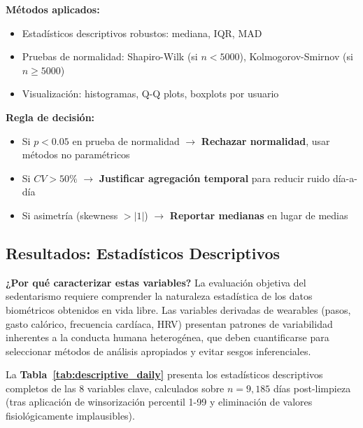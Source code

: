 \documentclass[12pt,letterpaper,twoside]{report}
\begin{document}
\begin{estadisticobox}
\textbf{Métodos aplicados:}

\begin{itemize}[noitemsep]
    \item Estadísticos descriptivos robustos: mediana, IQR, MAD
    \item Pruebas de normalidad: Shapiro-Wilk (si $n<5000$), Kolmogorov-Smirnov (si $n \geq 5000$)
    \item Visualización: histogramas, Q-Q plots, boxplots por usuario
\end{itemize}
\end{estadisticobox}

\begin{reglabox}
\textbf{Regla de decisión:}

\begin{itemize}[noitemsep]
    \item Si $p < 0.05$ en prueba de normalidad $\to$ \textbf{Rechazar normalidad}, usar métodos no paramétricos
    \item Si $CV > 50\%$ $\to$ \textbf{Justificar agregación temporal} para reducir ruido día-a-día
    \item Si asimetría (skewness $> |1|$) $\to$ \textbf{Reportar medianas} en lugar de medias
\end{itemize}
\end{reglabox}

\subsection{Resultados: Estadísticos Descriptivos}

\textbf{¿Por qué caracterizar estas variables?} La evaluación objetiva del sedentarismo requiere comprender la naturaleza estadística de los datos biométricos obtenidos en vida libre. Las variables derivadas de wearables (pasos, gasto calórico, frecuencia cardíaca, HRV) presentan patrones de variabilidad inherentes a la conducta humana heterogénea, que deben cuantificarse para seleccionar métodos de análisis apropiados y evitar sesgos inferenciales.

La \textbf{Tabla~\ref{tab:descriptive_daily}} presenta los estadísticos descriptivos completos de las 8 variables clave, calculados sobre $n=9,185$ días post-limpieza (tras aplicación de winsorización percentil 1-99 y eliminación de valores fisiológicamente implausibles).
\end{document}
